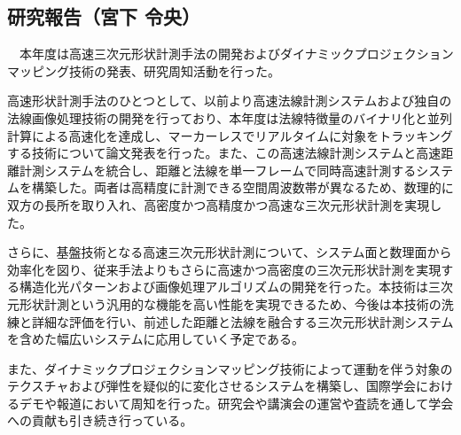 \subsection{研究報告（宮下 令央）}

　本年度は高速三次元形状計測手法の開発およびダイナミックプロジェクションマッピング技術の発表、研究周知活動を行った。

 高速形状計測手法のひとつとして、以前より高速法線計測システムおよび独自の法線画像処理技術の開発を行っており、本年度は法線特徴量のバイナリ化と並列計算による高速化を達成し、マーカーレスでリアルタイムに対象をトラッキングする技術について論文発表を行った。また、この高速法線計測システムと高速距離計測システムを統合し、距離と法線を単一フレームで同時高速計測するシステムを構築した。両者は高精度に計測できる空間周波数帯が異なるため、数理的に双方の長所を取り入れ、高密度かつ高精度かつ高速な三次元形状計測を実現した。

 さらに、基盤技術となる高速三次元形状計測について、システム面と数理面から効率化を図り、従来手法よりもさらに高速かつ高密度の三次元形状計測を実現する構造化光パターンおよび画像処理アルゴリズムの開発を行った。本技術は三次元形状計測という汎用的な機能を高い性能を実現できるため、今後は本技術の洗練と詳細な評価を行い、前述した距離と法線を融合する三次元形状計測システムを含めた幅広いシステムに応用していく予定である。

 また、ダイナミックプロジェクションマッピング技術によって運動を伴う対象のテクスチャおよび弾性を疑似的に変化させるシステムを構築し、国際学会におけるデモや報道において周知を行った。研究会や講演会の運営や査読を通して学会への貢献も引き続き行っている。
